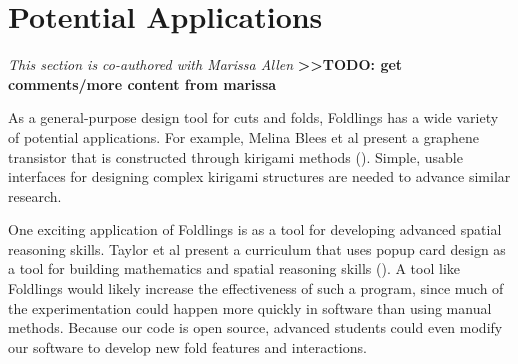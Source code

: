 \section{Potential Applications}\label{potential-applications}

\emph{This section is co-authored with Marissa Allen}
\textbf{\textgreater{}\textgreater{}TODO: get comments/more content from
marissa}

As a general-purpose design tool for cuts and folds, Foldlings has a
wide variety of potential applications. For example, Melina Blees et al
present a graphene transistor that is constructed through kirigami
methods (\citet{blees2014graphene}). Simple, usable interfaces for
designing complex kirigami structures are needed to advance similar
research.

One exciting application of Foldlings is as a tool for developing
advanced spatial reasoning skills. Taylor et al present a curriculum
that uses popup card design as a tool for building mathematics and
spatial reasoning skills \citet{taylor2013think3d}
(\citet{olson_mathematics_2004}). A tool like Foldlings would likely
increase the effectiveness of such a program, since much of the
experimentation could happen more quickly in software than using manual
methods. Because our code is open source, advanced students could even
modify our software to develop new fold features and interactions.

